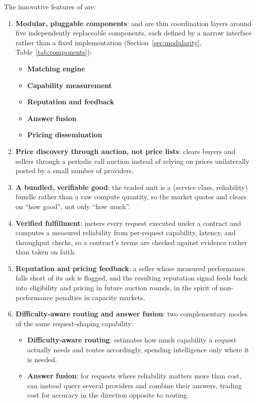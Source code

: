 The innovative features of \Noesis{} are:

\begin{enumerate}
  \item \textbf{Modular, pluggable components}: \NoesisMarket{} and
    \NoesisServer{} are thin coordination layers around five independently
    replaceable components, each defined by a narrow interface rather than a
    fixed implementation (Section~\ref{sec:modularity},
    Table~\ref{tab:components}):
    \begin{itemize}
      \item \textbf{Matching engine}
      \item \textbf{Capability measurement}
      \item \textbf{Reputation and feedback}
      \item \textbf{Answer fusion}
      \item \textbf{Pricing dissemination}
    \end{itemize}

  \item \textbf{Price discovery through auction, not price lists}:
    \NoesisMarket{} clears buyers and sellers through a periodic call
    auction instead of relying on prices unilaterally posted by a small
    number of providers.

  \item \textbf{A bundled, verifiable good}: the traded unit is a
    (service class, reliability) bundle rather than a raw compute
    quantity, so the market quotes and clears on ``how good'', not only
    ``how much''.

  \item \textbf{Verified fulfillment}: \NoesisServer{} meters every
    request executed under a contract and computes a measured reliability
    from per-request capability, latency, and throughput checks, so a
    contract's terms are checked against evidence rather
    than taken on faith.

  \item \textbf{Reputation and pricing feedback}: a seller whose measured
    performance falls short of its ask is flagged, and the resulting
    reputation signal feeds back into eligibility and pricing in future
    auction rounds, in the spirit of non-performance penalties in capacity
    markets.

  \item \textbf{Difficulty-aware routing and answer fusion}: two
    complementary modes of the same request-shaping capability:
    \begin{itemize}
      \item \textbf{Difficulty-aware routing}: \NoesisServer{} estimates how
        much capability a request actually needs and routes accordingly,
        spending intelligence only where it is needed.
      \item \textbf{Answer fusion}: for requests where reliability matters
        more than cost, \NoesisServer{} can instead query several providers
        and combine their answers, trading cost for accuracy in the direction
        opposite to routing.
    \end{itemize}


\end{enumerate}
